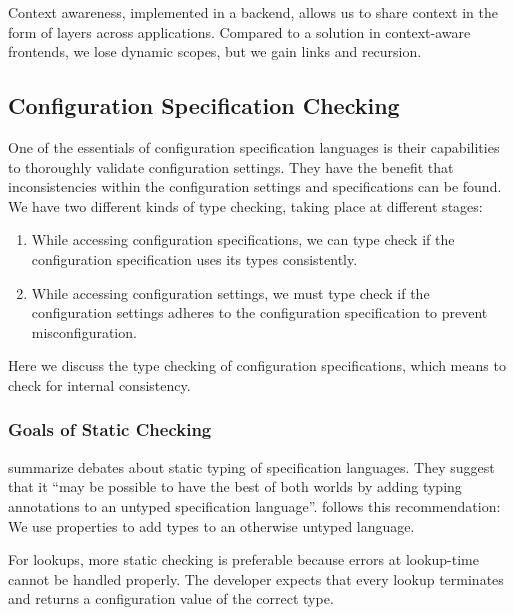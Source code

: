 \begin{finding}
Context awareness, implemented in a backend, allows us to share context in the form of layers across applications.
Compared to a solution in context-aware frontends, we lose dynamic scopes, but we gain links and recursion.
\end{finding}




\subsection{Configuration Specification Checking}
\label{sec:backend-specification-checking}

One of the essentials of configuration specification languages is their capabilities to thoroughly validate configuration settings.
They have the benefit that inconsistencies within the configuration settings and specifications can be found.
We have two different kinds of type checking, taking place at different stages:

\begin{enumerate}
\item
While accessing configuration specifications, we can type check if the configuration specification  uses its types consistently.

\item
While accessing configuration settings, we must type check if the configuration settings adheres to the configuration specification to prevent misconfiguration.
\end{enumerate}



Here we discuss the type checking of configuration specifications, which means to check  for internal consistency.

\subsubsection{Goals of Static Checking}

\citet{lamport1999should} summarize debates about static typing of specification languages.
They suggest that it \enquote{may be possible to have the best of both worlds by adding typing annotations to an untyped specification language}.
\elektra{} follows this recommendation:
We use properties to add types to an otherwise untyped language.


For lookups, more static checking is preferable because errors at lookup-time cannot be handled properly.
The developer expects that every lookup terminates and returns a configuration value of the correct type.

